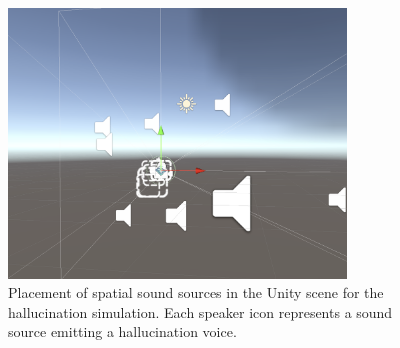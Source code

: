 \begin{figure}[h!] \centering \includegraphics[width=0.8\textwidth]{../../Figures/unity-scene.png} \caption{Placement of spatial sound sources in the Unity scene for the hallucination simulation. Each speaker icon represents a sound source emitting a hallucination voice.} \label{fig:sound_sources} \end{figure}

